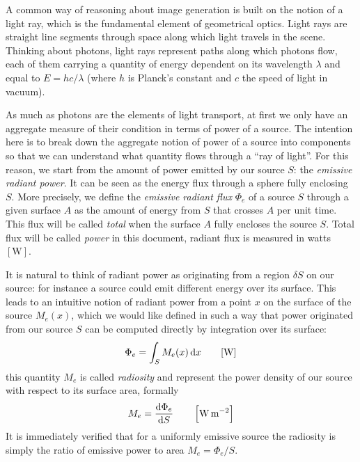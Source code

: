 A common way of reasoning about image generation is built on the notion of a
light ray, which is the fundamental element of geometrical optics. Light rays
are straight line segments through space along which light travels in the scene.
Thinking about photons, light rays represent paths along which photons flow,
each of them carrying a quantity of energy dependent on its wavelength $\lambda$
and equal to $E = hc/\lambda$ (where $h$ is Planck's constant and $c$ the speed
of light in vacuum).

As much as photons are the elements of light transport, at first we only have an
aggregate measure of their condition in terms of power of a source.
The intention here is to break down the aggregate notion of power of a source
into components so that we can understand what quantity flows through a ``ray of
light''.
For this reason, we start from the amount of power emitted by our source $S$:
the \textsl{emissive radiant power}.
It can be seen as the energy flux through a sphere fully enclosing $S$.
More precisely, we define the \textsl{emissive radiant flux} $\Phi_e$ of a
source $S$ through a given surface $A$ as the amount of energy from $S$ that
crosses $A$ per unit time. This flux will be called \textsl{total} when the surface
$A$ fully encloses the source $S$. Total flux will be called \textsl{power} in
this
document, radiant flux is measured in watts $[\si{\watt}]$.

It is natural to think of radiant power as originating from a region $\delta S$ on our source:
for instance a source could emit different energy over its surface. This leads to an
intuitive notion of radiant power from a point $x$ on the surface of the source
$M_e(x)$, which
we would like defined in such a way that power originated from our source $S$
can be computed
directly by integration over its surface:
\begin{displaymath}
\Phi_e = \int_{S} M_e(x) \mathop{}\!\mathrm{d} x \qquad [\si{\watt}]
\end{displaymath}
this quantity $M_e$ is called \textsl{radiosity} and represent the power density
of our
source with respect to its surface area, formally
\begin{displaymath}
M_e = \frac{\mathop{}\!\mathrm{d}\Phi_e}{\mathop{}\!\mathrm{d} S} \qquad \left[\si{\watt\per\square\meter}\right]
\end{displaymath}
It is immediately verified that for a uniformly emissive source the
radiosity is simply the ratio of emissive power to area
$M_e = \Phi_e / S$.

